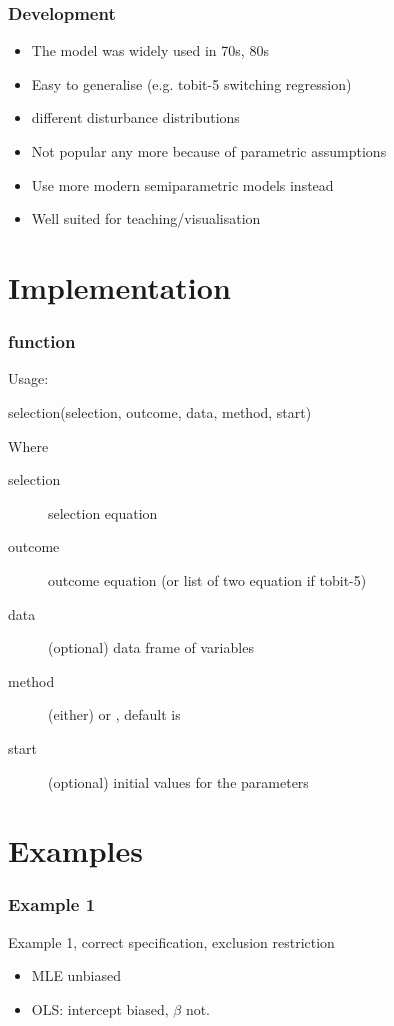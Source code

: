 \documentclass{beamer}
\begin{document}
\begin{frame}
  \frametitle{Development}
  \begin{itemize}
  \item The model was widely used in 70s, 80s
  \item Easy to generalise (e.g. tobit-5 switching regression)
  \item different disturbance distributions
    \pause
  \item Not popular any more because of parametric assumptions
  \item Use more modern semiparametric models instead
  \item Well suited for teaching/visualisation
  \end{itemize}
\end{frame}



\section{Implementation}

\begin{frame}
  \frametitle{ function}
  
  Usage:
  \begin{code}
    selection(selection, outcome, data, method, start)
  \end{code}
  Where
  \begin{description}
  \item[selection] selection equation
  \item[outcome] outcome equation (or list of two equation if tobit-5)
  \item[data] (optional) data frame of variables
  \item[method] (either)  or , default is
  \item[start] (optional) initial values for the parameters
  \end{description}
\end{frame}


\section{Examples}

\begin{frame}
  \frametitle{Example 1}
  Example 1, correct specification, exclusion restriction

  \begin{itemize}
  \item MLE unbiased
  \item OLS: intercept biased, $\beta$ not.
  \end{itemize}
\end{frame}
\end{document}
